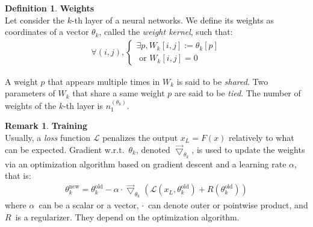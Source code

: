\documentclass{article}
\theoremstyle{definition}
\newtheorem{definition}{Definition}[section]
\newtheorem{remark}{Remark}
\newcommand{\ovec}{}
\begin{document}
\begin{definition}\textbf{Weights}\\
Let consider the $k$-th layer of a neural networks. We define its weights as coordinates of a vector $\theta_k$, called the \emph{weight kernel}, such that:
\begin{gather*}
  \forall (i,j),
    \begin{cases}
      \exists p, W_k[i,j] := \theta_k[p] \\
      \text{ or } W_k[i,j] = 0
    \end{cases}
\end{gather*}
\end{definition}
A weight $p$ that appears multiple times in $W_k$ is said to be \emph{shared}. Two parameters of $W_k$ that share a same weight $p$ are said to be \emph{tied}. The number of weights of the $k$-th layer is $n_1^{(\theta_k)}$.


\begin{remark}\textbf{Training}\\
Usually, a \emph{loss} function $\mathcal{L}$ penalizes the output $x_L = F(\ovec{x})$ relatively to what can be expected. Gradient w.r.t.~$\theta_k$, denoted $\vec{\bigtriangledown}_{\theta_k}$, is used to update the weights via an optimization algorithm based on gradient descent and a learning rate $\alpha$, that is:
\begin{gather}
\theta_k^{\text{new}} = \theta_k^{\text{old}} - \alpha \cdot \vec{\bigtriangledown}_{\theta_k} \left( \mathcal{L}(x_L, \theta_k^{\text{old}}) + R(\theta_k^{\text{old}}) \right)
\end{gather}
where $\alpha$~can be a scalar or a vector, $\cdot$~can denote outer or pointwise product, and $R$~is a regularizer. They depend on the optimization algorithm.
\end{remark}
\end{document}
